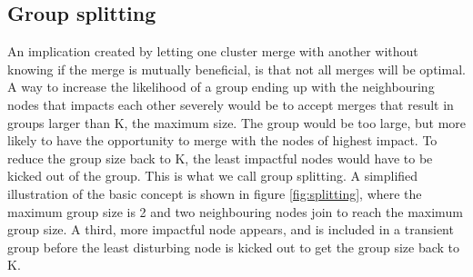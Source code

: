 \subsection{Group splitting}
An implication created by letting one cluster merge with another without knowing if the merge is mutually beneficial, is that not all merges will be optimal.
A way to increase the likelihood of a group ending up with the neighbouring nodes that impacts each other severely would be to accept merges that result in groups larger than K, the maximum size. 
The group would be too large, but more likely to have the opportunity to merge with the nodes of highest impact. To reduce the group size back to K,
the least impactful nodes would have to be kicked out of the group. This is what we call group splitting. A simplified illustration of the basic concept is shown in figure \ref{fig:splitting},
where the maximum group size is 2 and two neighbouring nodes join to reach the maximum group size. A third, more impactful node appears, and is included in a transient group
before the least disturbing node is kicked out to get the group size back to K. 

